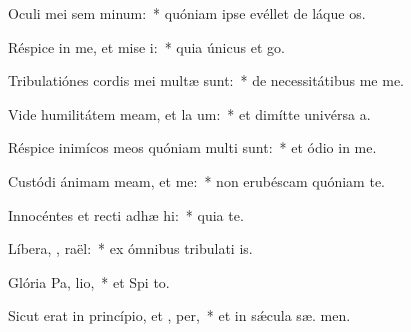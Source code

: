 \item Oculi mei sem  minum:~* quóniam ipse evéllet de láque  os.
\item Réspice in me, et mise i:~* quia únicus et   go.
\item Tribulatiónes cordis mei multæ sunt:~* de necessitátibus me  me.
\item Vide humilitátem meam, et la um:~* et dimítte univérsa  a.
\item Réspice inimícos meos quóniam multi sunt:~* et ódio in  me.
\item Custódi ánimam meam, et  me:~* non erubéscam quóniam   te.
\item Innocéntes et recti adhæ hi:~* quia  te.
\item Líbera, , raël:~* ex ómnibus tribulati is.
\item Glória Pa,  lio,~* et Spi to.
\item Sicut erat in princípio, et ,  per,~* et in sǽcula sæ. men.
